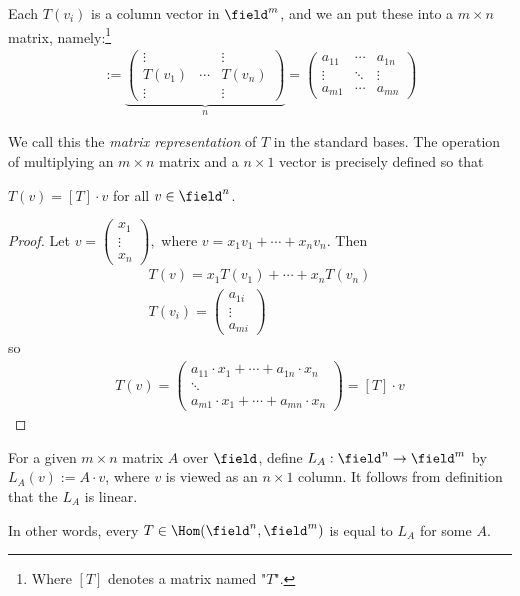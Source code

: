 Each $T(v_i)$ is a column vector in $\field^m$, and we an put these into a $m \times n$ matrix, namely:\footnote{Where $[T]$ denotes a matrix named "$T$".}
\begin{align*}
    [T] := \underbrace{\begin{pmatrix}
        \vdots & & \vdots \\
        T(v_1) & \cdots & T(v_n) \\
        \vdots & & \vdots 
    \end{pmatrix}}_{n} = \begin{pmatrix}
        a_{11} & \cdots & a_{1n}\\
        \vdots & \ddots & \vdots\\
        a_{m1} & \cdots & a_{mn}
    \end{pmatrix}
\end{align*}

We call this the \emph{matrix representation} of $T$ in the standard bases. The operation of multiplying an $m \times n$ matrix and a $n \times 1$ vector is precisely defined so that \begin{proposition}\label{prop:tofvequalmatt}
    $T(v) = [T] \cdot v$ for all $v \in \field^n$.
\end{proposition}

\begin{proof}
    Let $v = \begin{pmatrix}
        x_1\\
        \vdots\\
        x_n
    \end{pmatrix},$ where $v = x_1 v_1 + \cdots + x_n v_n$. Then \begin{align*}
        T(v) = x_1 T(v_1) + \cdots + x_n T(v_n)\\
        T(v_i) = \begin{pmatrix}
            a_{1i}\\
            \vdots\\
            a_{mi}
        \end{pmatrix}
    \end{align*}
    so
    \begin{align*}
        T(v) = \begin{pmatrix}
            a_{11} \cdot x_1 + \cdots + a_{1n} \cdot x_n\\
            \ddots \\
            a_{m1} \cdot x_1 + \cdots + a_{mn} \cdot x_n
        \end{pmatrix} = [T]\cdot v  
    \end{align*}
\end{proof}

\begin{definition}
    For a given $m \times n$ matrix $A$ over $\field$, define $L_A : \field^n \to \field^m$ by $L_A (v) := A \cdot v$, where $v$ is viewed as an $n \times 1$ column. It follows from definition that the $L_A$ is linear.

    In other words, every $T \in \Hom(\field^n, \field^m)$ is equal to $L_A$ for some $A$.
\end{definition}